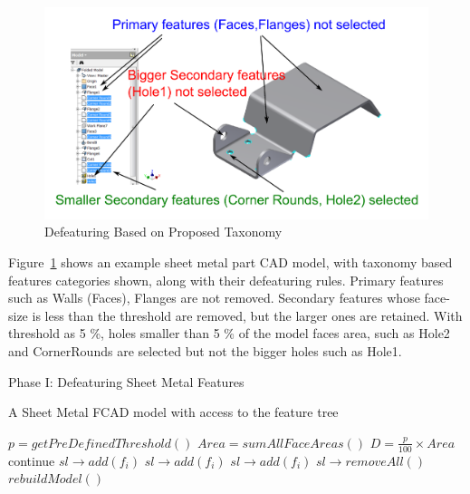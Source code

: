  	\begin{figure} [!h]
		\centering
		\includegraphics[width=0.62\linewidth]{..//Common/images/SheetMetal_Ph1_Selection_Annotated_1.pdf}
		\caption{Defeaturing Based on Proposed Taxonomy }\label{fig:defeaturing:actions}
	\end{figure}
	
Figure~\ref{fig:defeaturing:actions} shows an example sheet metal part CAD model, with taxonomy based features categories shown, along with their defeaturing rules. Primary features such as Walls (Faces), Flanges are not removed. Secondary features whose face-size is less than the threshold are removed, but the larger ones are retained. With threshold as 5 \%, holes smaller than 5 \% of the model faces area, such as Hole2 and CornerRounds are selected but not the bigger holes such as Hole1.
 
 
\begin{algorithm}[H]
	\caption{Phase I: Defeaturing Sheet Metal Features}
	\label{alg:defeaturing:phase1}
	\begin{algorithmic}[1]
		\REQUIRE A Sheet Metal FCAD model with access to the feature tree
		
		\STATE $p = getPreDefinedThreshold()$
		\STATE $Area = sumAllFaceAreas()$
		\STATE $D = \frac{p}{100} \times Area$
				\STATE continue
				\STATE $sl \rightarrow add(f_i)$
			  		\STATE $sl \rightarrow add(f_i)$
				\ENDIF
			\ELSE
			  		\STATE $sl \rightarrow add(f_i)$
				\ENDIF				
			\ENDIF
		\ENDWHILE
		\STATE  $sl \rightarrow removeAll()$
		\STATE  $rebuildModel()$
	\end{algorithmic}
\end{algorithm}

